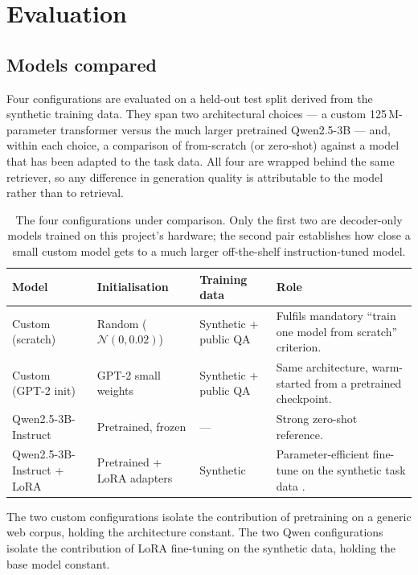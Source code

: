 \section{Evaluation}
\label{sec:evaluation}

\subsection{Models compared}

Four configurations are evaluated on a held-out test split derived from the synthetic
training data. They span two architectural choices --- a custom 125\,M-parameter
transformer versus the much larger pretrained Qwen2.5-3B --- and, within each choice, a
comparison of from-scratch (or zero-shot) against a model that has been adapted to the
task data. All four are wrapped behind the same retriever, so any difference in
generation quality is attributable to the model rather than to retrieval.

\begin{table}[h]
\centering
\small
\begin{tabular}{p{3.4cm}p{3.0cm}p{2.6cm}p{4.2cm}}
\toprule
\textbf{Model} & \textbf{Initialisation} & \textbf{Training data} & \textbf{Role} \\
\midrule
Custom (scratch) & Random ($\mathcal{N}(0, 0.02)$) & Synthetic + public QA &
Fulfils mandatory ``train one model from scratch'' criterion. \\
Custom (GPT-2 init) & GPT-2 small weights & Synthetic + public QA &
Same architecture, warm-started from a pretrained checkpoint. \\
Qwen2.5-3B-Instruct & Pretrained, frozen & --- & Strong zero-shot reference. \\
Qwen2.5-3B-Instruct + LoRA & Pretrained + LoRA adapters & Synthetic & Parameter-efficient
fine-tune on the synthetic task data \cite{hu2022lora}. \\
\bottomrule
\end{tabular}
\caption{The four configurations under comparison. Only the first two are decoder-only models
trained on this project's hardware; the second pair establishes how close a small custom model
gets to a much larger off-the-shelf instruction-tuned model.}
\label{tab:models}
\end{table}

The two custom configurations isolate the contribution of pretraining on a generic web
corpus, holding the architecture constant. The two Qwen configurations isolate the
contribution of LoRA fine-tuning on the synthetic data, holding the base model constant.

